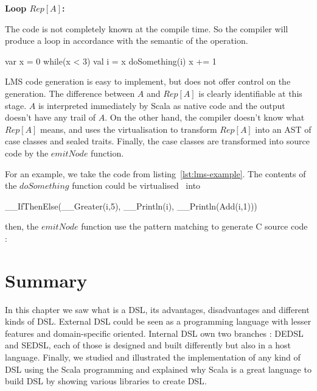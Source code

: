 \textbf{Loop $Rep[A]$:}

The code  is not completely known at
the compile time. So the compiler will produce a loop in accordance with the
semantic of the operation.
\begin{scalacode}
var x = 0
while(x < 3) {
  val i = x
  doSomething(i)
  x += 1
}
\end{scalacode}

LMS code generation is easy to implement, but does not offer control on the
generation. The difference between $A$ and $Rep[A]$ is clearly identifiable at this
stage. $A$ is interpreted immediately by Scala as native code and the output
doesn't have any trail of $A$. On the other hand, the compiler doesn't know what
$Rep[A]$ means, and uses the virtualisation to transform $Rep[A]$ into an
\gls{AST} of case classes and sealed traits. Finally, the case classes are
transformed into source code by the $emitNode$ function.

For an example, we take the code from listing~\ref{lst:lms-example}. The
contents of the $doSomething$ function could be virtualised~\cite{Rompf2012} into

\begin{scalacode}
__IfThenElse(__Greater(i,5), __Println(i), __Println(Add(i,1)))
\end{scalacode}

then, the $emitNode$ function use the pattern matching to generate C source code :


\section{Summary}
\label{sec:dsl_summary}

In this chapter we saw what is a \gls{DSL}, its advantages, disadvantages and
different kinds of \gls{DSL}. External \gls{DSL} could be seen as a programming
language with lesser features and domain-specific oriented. Internal \gls{DSL}
own two branches : \gls{DEDSL} and \gls{SEDSL}, each of those is designed and
built differently but also in a host language. Finally, we studied and
illustrated the implementation of any kind of \gls{DSL} using the Scala
programming and explained why Scala is a great language to build \gls{DSL} by
showing various libraries to create \gls{DSL}.

